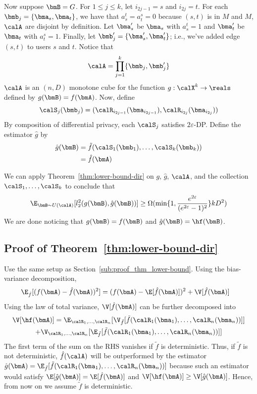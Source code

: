 Now suppose $\bmB = G$. For $1 \leq j \leq k$,
let $i_{2j-1} = s$ and $i_{2j} = t$. For each $\bmb_j = \{\bma_{s}, \bma_t\}$, 
we have that $a_s^t = a_t^s = 0$ because $(s,t)$ is in $M$ and $M$, $\calA$ are
disjoint by definition. Let $\bma_s'$ be $\bma_s$ with $a_s^t = 1$ and $\bma_t'$
be $\bma_t$ with $a_t^s = 1$. Finally, let $\bmb_j' = \{\bma_{s}', \bma_t'\}$;
i.e., we've added edge $(s,t)$ to users $s$ and $t$.
Notice that
\[
  \calA = \prod_{j=1}^k \{\bmb_j, \bmb_j'\}
\]
$\calA$ is an $(n,D)$ monotone cube for the function $g : \calX^k \rightarrow
\reals$ defined by $g(\bmB) = f(\bmA)$.
Now, define
\[
  \calS_j(\bmb_j) = (\calR_{i_{2j-1}}(\bma_{i_{2j-1}}),
  \calR_{i_{2j}}(\bma_{i_{2j}}))
\]
By composition of differential privacy, each $\calS_j$ satisfies 
$2\varepsilon$-DP.
Define the estimator $\hat{g}$ by
\begin{align*}
  \hat{g}(\bmB) &= \tilde{f}(\calS_{1}(\bmb_1), \ldots,
  \calS_{k}(\bmb_k)) \\
  &= \hat{f}(\bmA)
\end{align*}

We can apply Theorem~\ref{thm:lower-bound-dir} on $g$, $\hat{g}$, $\calA$, and 
the collection $\calS_1,\ldots, \calS_k$ to conclude that
\[
  \E_{\bmB \sim U(\calA)}[l_2^2(g(\bmB), \hat{g}(\bmB) )] \geq \Omega(\min\{1,
  \frac{e^{2\varepsilon}}{(e^{2\varepsilon}-1)^2}\}kD^2)
\]
We are done noticing that $g(\bmB) = f(\bmB)$ and $\hat{g}(\bmB) = \hf(\bmB)$.

\subsection{Proof of
Theorem~\ref{thm:lower-bound-dir}}\label{sub:proof_thm_lower-bound-dir}

Use the same setup as Section~\ref{sub:proof_thm_lower-bound}.
Using the bias-variance decomposition,
\begin{align*}
\E_{\hat{f}}[ (f(\bmA) - \hat{f}(\bmA))^2] &= (f(\bmA) - \E[\hat{f}(\bmA)])^2 + \V[\hat{f}(\bmA)]
\end{align*}
Using the law of total variance, $\V[\hat{f}(\bmA)]$ can be further decomposed into
\begin{multline*}
  \V[\hf(\bmA)] = \E_{\calR_1,\ldots,\calR_n}[\V_{\tilde{f}}[
        \tilde{f}(\calR_1(\bma_1),\ldots,\calR_n(\bma_n)) ]] \\
        +
        \V_{\calR_1,\ldots,\calR_n}[\E_{\tilde{f}}[\tilde{f}(\calR_1(\bma_1),
          \ldots,\calR_n(\bma_n))]]
\end{multline*}
The first term of the sum on the RHS vanishes if $\tilde{f}$ is deterministic.
Thus, if $\tilde{f}$ is not deterministic, $\hat{f}(\calA)$ will be outperformed by the
estimator $\hat{g}(\bmA) =
\E_{\tilde{f}}[\tilde{f}(\calR_1(\bma_1),\ldots,\calR_n(\bma_n) )]$ because such
an estimator would satisfy $\E[\hat{g}(\bmA)] = \E[\hat{f}(\bmA)]$ and
$\V[\hf(\bmA)] \geq \V[\hat{g}(\bmA)]$. Hence, from now on we assume $\tilde{f}$
is deterministic.

